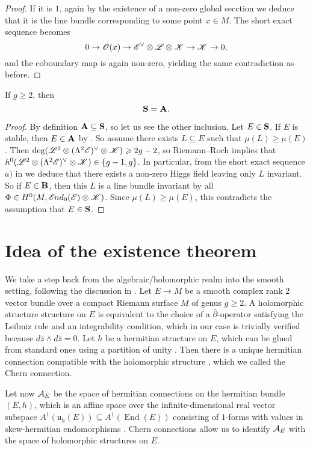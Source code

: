 \documentclass[A4paper, 12pt, british, reqno]{amsart}
\DeclareMathOperator{\End}{End}
\newcommand{\ot}{\otimes}
\newcommand{\dual}{^{\vee}}
\renewcommand{\u}{\mathfrak{u}}
\begin{document}
\begin{lm}
\begin{proof}
	If it is $1$, again by the existence of a non-zero global secction we deduce that it is the line bundle corresponding to some point $x\in M$.
	The short exact sequence becomes
	\[ 0\to \O(x)\to \E\dual\ot\L\ot\sK\to \sK\to 0, \]
	and the coboundary map is again non-zero, yielding the same contradiction as before.
    \end{proof}
\end{lm}

\begin{lm}
    If $g\geqslant 2$, then
    \[ \mathbf{S}=\mathbf{A}. \]
    \begin{proof}
	By definition $\mathbf{A}\subseteq \mathbf{S}$, so let us see the other inclusion.
	Let $E\in \mathbf{S}$.
	If $E$ is stable, then $E\in \mathbf{A}$ by .
	So assume there exists $L\subseteq E$ such that $\mu(L)\geqslant \mu(E)$.
	Then $\deg(\L^{2}\ot(\Lambda^{2}\E)\dual\ot\sK)\geqslant 2g-2$, so Riemann--Roch implies that $h^{0}(\L^{2}\ot(\Lambda^{2}\E)\dual\ot\sK)\in \{g-1,g\}$.
	In particular, from the short exact sequence $a)$ in  we deduce that there exists a non-zero Higgs field leaving only $L$ invariant.
	So if $E\in \mathbf{B}$, then this $L$ is a line bundle invariant by all $\Phi\in H^{0}(M,\sEnd_{0}(\E)\ot \sK)$.
	Since $\mu(L)\geqslant \mu(E)$, this contradicts the assumption that $E\in \mathbf{S}$.
    \end{proof}
\end{lm}

\section{Idea of the existence theorem}

We take a step back from the algebraic/holomorphic realm into the smooth setting, following the discussion in \cite[\S 2.1.1]{wen14}.
Let $E\to M$ be a smooth complex rank $2$ vector bundle over a compact Riemann surface $M$ of genus $g\geqslant 2$.
A holomorphic structure structure on $E$ is equivalent to the choice of a $\bar{\partial}$-operator \cite[Theorem 2.6.26]{huy05} satisfying the Leibniz rule and an integrability condition, which in our case is trivially verified because $d\bar{z}\wedge d\bar{z}=0$.
Let $h$ be a hermitian structure on $E$, which can be glued from standard ones using a partition of unity \cite[Proposition 4.1.4]{huy05}.
Then there is a unique hermitian connection compatible with the holomorphic structure \cite[Proposition 4.2.14]{huy05}, which we called the Chern connection.

Let now $\mathcal{A}_{E}$ be the space of hermitian connections on the hermitian bundle $(E,h)$, which is an affine space over the infinite-dimensional real vector subspace $A^{1}(\u_{h}(E))\subseteq A^{1}(\End(E))$ consisting of $1$-forms with values in skew-hermitian endomorphisms \cite[Corollary 4.2.11]{huy05}.
Chern connections allow us to identify $\mathcal{A}_{E}$ with the space of holomorphic structures on $E$.
\end{document}
